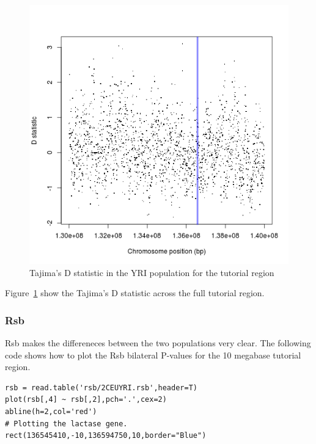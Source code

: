 \documentclass[a4paper,10pt]{article}
\begin{document}
\begin{figure}
\centering
\includegraphics{pictures/YRItajimas.png}
\caption{Tajima's D statistic in the YRI population for the tutorial region} 
\label{fig:tajyri}
\end{figure}

\noindent
Figure~\ref{fig:tajyri} show the Tajima's D statistic across the full tutorial region.

\subsubsection{Rsb}

Rsb makes the differeneces between the two populations very clear. The following code shows how to plot the Rsb bilateral P-values for the 10 megabase tutorial region.
\noindent
\begin{verbatim}
rsb = read.table('rsb/2CEUYRI.rsb',header=T)
plot(rsb[,4] ~ rsb[,2],pch='.',cex=2)
abline(h=2,col='red')
# Plotting the lactase gene.
rect(136545410,-10,136594750,10,border="Blue")
\end{verbatim}
\end{document}
